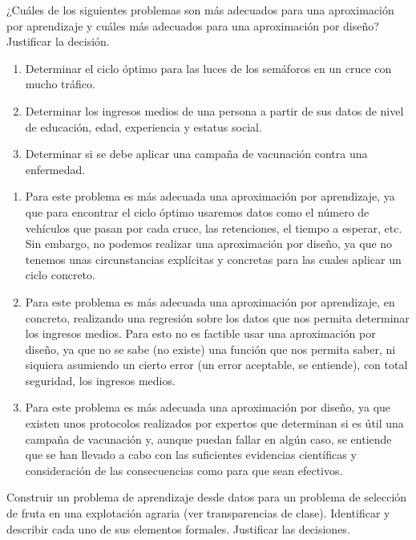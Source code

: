 \documentclass[11pt,leqno]{article}
\theoremstyle{definition}
\begin{document}
\begin{cuestion}
¿Cuáles de los siguientes problemas son más adecuados para una aproximación por aprendizaje y cuáles más adecuados para una aproximación por diseño? Justificar la decisión.
\begin{enumerate}[a]
\item Determinar el ciclo óptimo para las luces de los semáforos en un cruce con mucho tráfico.
\item Determinar los ingresos medios de una persona a partir de sus datos de nivel de educación, edad, experiencia y estatus social.
\item Determinar si se debe aplicar una campaña de vacunación contra una enfermedad.
\end{enumerate}
\end{cuestion}

\begin{solucion}
\begin{enumerate}[a]
\item Para este problema es más adecuada una aproximación por aprendizaje, ya que para encontrar el ciclo óptimo usaremos datos como el número de vehículos que pasan por cada cruce, las retenciones, el tiempo a esperar, etc. Sin embargo, no podemos realizar una aproximación por diseño, ya que no tenemos unas circunstancias explícitas y concretas para las cuales aplicar un ciclo concreto.
\item Para este problema es más adecuada una aproximación por aprendizaje,  en concreto, realizando una regresión sobre los datos que nos permita determinar los ingresos medios. Para esto no es factible usar una aproximación por diseño, ya que no se sabe (no existe) una función que nos permita saber, ni siquiera asumiendo un cierto error (un error aceptable, se entiende), con total seguridad, los ingresos medios.
\item Para este problema es más adecuada una aproximación por diseño, ya que existen unos protocolos realizados por expertos que determinan si es útil una campaña de vacunación y, aunque puedan fallar en algún caso, se entiende que se han llevado a cabo con las suficientes evidencias científicas y consideración de las consecuencias como para que sean efectivos.
\end{enumerate}
\end{solucion}

\begin{cuestion}
Construir un problema de aprendizaje desde datos para un problema de selección de fruta en una explotación agraria (ver transparencias de clase). Identificar y describir cada uno de sus elementos formales. Justificar las decisiones.
\end{cuestion}
\end{document}
